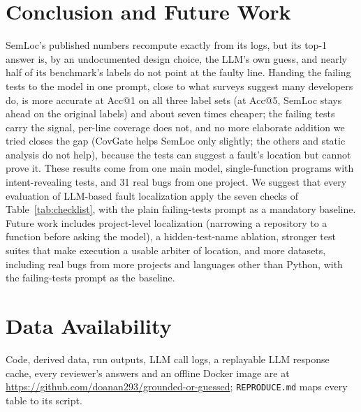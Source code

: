 \section{Conclusion and Future Work}
\label{sec:conclusion}

SemLoc's published numbers recompute exactly from its logs, but its top-1 answer is, by an undocumented design choice,
the LLM's own guess, and nearly half of its benchmark's labels do not point at the faulty line.
Handing the failing tests to the model in one prompt, close to what surveys suggest many developers do, is more accurate at Acc@1 on all three
label sets (at Acc@5, SemLoc stays ahead on the original labels) and about seven times cheaper; the failing tests carry the signal, per-line coverage does not, and no more
elaborate addition we tried closes the gap (CovGate helps SemLoc only slightly; the others and static analysis do not help), because the tests can suggest a fault's location
but cannot prove it. These results come from one main model, single-function programs with intent-revealing tests, and
31 real bugs from one project. We suggest that every evaluation of LLM-based fault localization apply the seven checks of
Table~\ref{tab:checklist}, with the plain failing-tests prompt as a mandatory baseline. Future work includes
project-level localization (narrowing a repository to a function before asking the model), a hidden-test-name ablation,
stronger test suites that make execution a usable arbiter of location, and more datasets, including real bugs from more
projects and languages other than Python, with the failing-tests prompt as the baseline.

\section*{Data Availability}
Code, derived data, run outputs, LLM call logs, a replayable LLM response cache, every reviewer's answers and an offline
Docker image are at \url{https://github.com/doanan293/grounded-or-guessed}; \texttt{REPRODUCE.md} maps every table to its
script.
